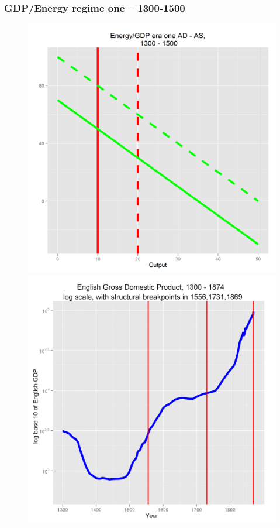 \documentclass[final]{beamer}
\begin{document}
\begin{frame}
\frametitle{GDP/Energy regime one -- 1300-1500}
		\begin{figure}[p!]
		\label{fig:asad}		
		\centerline{
		\mbox{\includegraphics[height=0.5\textheight]{era1}}
		\mbox{\includegraphics[height=0.5\textheight]{gbpgdplog}}
}
\end{figure}
\end{frame}
\end{document}
